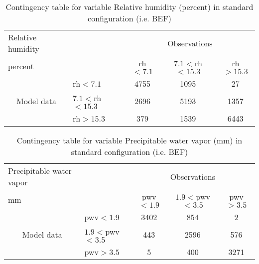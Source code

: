 \documentclass[11pt,english]{article}
\begin{document}
\begin{table}[]
\begin{center}
\begin{tabular}{llccc}
\hline
{Relative humidity}                                       &                                                    & \multicolumn{3}{c}{Observations}                 \\
{percent}                                       &                             & rh$<7.1$   & $7.1<$rh$<15.3$ & rh$>15.3$ \\
\hline
\multicolumn{1}{c}{\multirow{3}{*}{Model data}}  & rh$<7.1$          & 4755                & 1095                       & 27              \\
                                                 & $7.1<$rh$<15.3$ & 2696                & 5193                       & 1357              \\
                                                 & rh$>15.3$          & 379                & 1539                       & 6443              \\
\hline
\end{tabular}
\end{center}
\caption{Contingency table for variable Relative humidity (percent) in standard configuration (i.e. BEF)}
\label{tab:contingency}
\end{table}

\begin{table}[]
\begin{center}
\begin{tabular}{llccc}
\hline
{Precipitable water vapor}                                       &                                                    & \multicolumn{3}{c}{Observations}                 \\
{mm}                                       &                             & pwv$<1.9$   & $1.9<$pwv$<3.5$ & pwv$>3.5$ \\
\hline
\multicolumn{1}{c}{\multirow{3}{*}{Model data}}  & pwv$<1.9$          & 3402                & 854                       & 2              \\
                                                 & $1.9<$pwv$<3.5$ & 443                & 2596                       & 576              \\
                                                 & pwv$>3.5$          & 5                & 400                       & 3271              \\
\hline
\end{tabular}
\end{center}
\caption{Contingency table for variable Precipitable water vapor (mm) in standard configuration (i.e. BEF)}
\label{tab:contingency}
\end{table}
\end{document}
